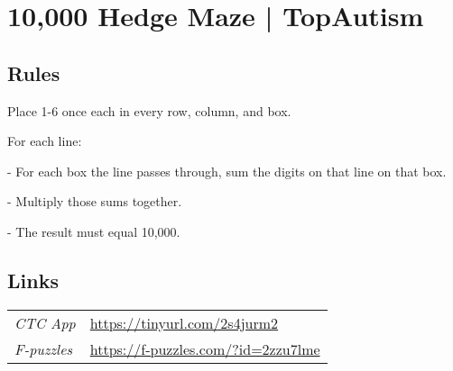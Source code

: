 \section[10,000 Hedge Maze | TopAutism {[\emph{Factorization Puzzle}]}]{10,000 Hedge Maze | {\normalfont TopAutism}}
\label{sec:52-10000-hedge-maze-topautism}

\subsection*{Rules}
\begin{markdown}
Place 1-6 once each in every row, column, and box.

For each line:

- For each box the line passes through, sum the digits on that line on that box.

- Multiply those sums together.

- The result must equal 10,000.
\end{markdown}
\subsection*{Links}
\begin{tabularx}{\textwidth}{l X}
\emph{CTC App} & \url{https://tinyurl.com/2s4jurm2} \\
\emph{F-puzzles} & \url{https://f-puzzles.com/?id=2zzu7lme} \\
\end{tabularx}
\pagebreak
